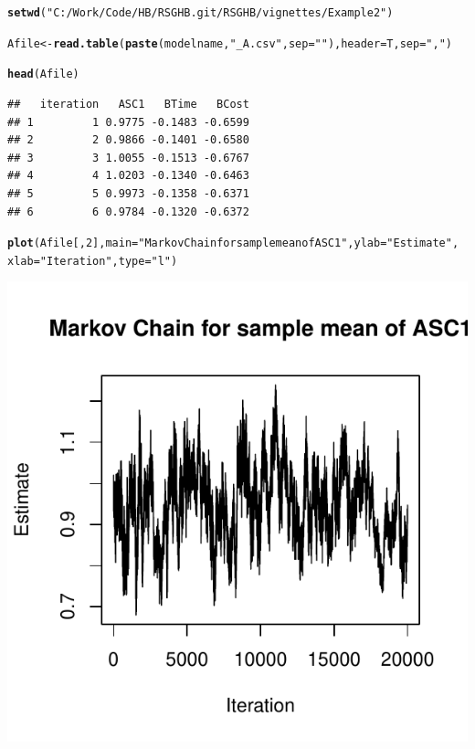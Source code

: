 \documentclass{article}\usepackage{graphicx, color}
\makeatletter
\def\maxwidth{ %
  \ifdim\Gin@nat@width>\linewidth
    \linewidth
  \else
    \Gin@nat@width
  \fi
}
\newcommand{\hlfunctioncall}[1]{\textcolor[rgb]{0.501960784313725,0,0.329411764705882}{\textbf{#1}}}%
\newcommand{\hlstring}[1]{\textcolor[rgb]{0.6,0.6,1}{#1}}%
\newenvironment{kframe}{%
 \def\at@end@of@kframe{}%
 \ifinner\ifhmode%
  \def\at@end@of@kframe{\end{minipage}}%
  \begin{minipage}{\columnwidth}%
 \fi\fi%
 \def\FrameCommand##1{\hskip\@totalleftmargin \hskip-\fboxsep
 \colorbox{shadecolor}{##1}\hskip-\fboxsep
     \hskip-\linewidth \hskip-\@totalleftmargin \hskip\columnwidth}%
 \MakeFramed {\advance\hsize-\width
   \@totalleftmargin\z@ \linewidth\hsize
   \@setminipage}}%
 {\par\unskip\endMakeFramed%
 \at@end@of@kframe}
\newenvironment{knitrout}{}{} %
\makeatother
\begin{document}
\begin{knitrout}
\color{fgcolor}\begin{kframe}
\begin{alltt}

\hlfunctioncall{setwd}(\hlstring{"C:/Work/Code/HB/RSGHB.git/RSGHB/vignettes/Example2"})

Afile <- \hlfunctioncall{read.table}(\hlfunctioncall{paste}(modelname, \hlstring{"_A.csv"}, sep = \hlstring{""}), header = T, sep = \hlstring{","})

\hlfunctioncall{head}(Afile)
\end{alltt}
\begin{verbatim}
##   iteration   ASC1   BTime   BCost
## 1         1 0.9775 -0.1483 -0.6599
## 2         2 0.9866 -0.1401 -0.6580
## 3         3 1.0055 -0.1513 -0.6767
## 4         4 1.0203 -0.1340 -0.6463
## 5         5 0.9973 -0.1358 -0.6371
## 6         6 0.9784 -0.1320 -0.6372
\end{verbatim}
\begin{alltt}

\hlfunctioncall{plot}(Afile[, 2], main = \hlstring{"Markov Chain for sample mean of ASC1"}, ylab = \hlstring{"Estimate"}, 
    xlab = \hlstring{"Iteration"}, type = \hlstring{"l"})
\end{alltt}
\end{kframe}
\includegraphics[width=\maxwidth]{figure/unnamed-chunk-10} 

\end{knitrout}
\end{document}
